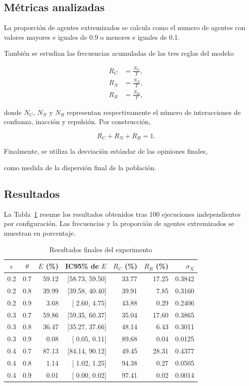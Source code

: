 \documentclass[11pt,a4paper]{article}
\begin{document}
\subsection{Métricas analizadas}

La proporción de agentes extremizados se calcula como el numero de agentes con valores mayores e iguales de 0.9 o menores e iguales de 0.1.

También se estudian las frecuencias acumuladas de las tres reglas del modelo:

\begin{align}
R_C &= \frac{N_C}{T},\\
R_N &= \frac{N_N}{T},\\
R_R &= \frac{N_R}{T},
\end{align}

donde $N_C$, $N_N$ y $N_R$ representan respectivamente el número de interacciones de confianza, inacción y repulsión. Por construcción,

\begin{equation}
R_C + R_N + R_R = 1.
\end{equation}

Finalmente, se utiliza la desviación estándar de las opiniones finales,

como medida de la dispersión final de la población.

\subsection{Resultados}

La Tabla~\ref{tab:baseline-results} resume los resultados obtenidos tras 100 ejecuciones independientes por configuración. Las frecuencias y la proporción de agentes extremizados se muestran en porcentaje.

\begin{table}[htbp]
\centering
\caption{Resultados finales del experimento}
\label{tab:baseline-results}
\small
\begin{tabular}{ccrrrrr}
\toprule
$\epsilon$ & $\theta$ &
$E$ (\%) &
IC95\% de $E$ &
$R_C$ (\%) &
$R_R$ (\%) &
$\sigma_X$ \\
\midrule
0.2 & 0.7 & 59.12 & [58.73, 59.50] & 33.77 & 17.25 & 0.3842 \\
0.2 & 0.8 & 39.99 & [39.58, 40.40] & 39.91 &  7.85 & 0.3160 \\
0.2 & 0.9 &  3.68 & [ 2.60,  4.75] & 43.88 &  0.29 & 0.2406 \\
0.3 & 0.7 & 59.86 & [59.35, 60.37] & 35.04 & 17.60 & 0.3865 \\
0.3 & 0.8 & 36.47 & [35.27, 37.66] & 48.14 &  6.43 & 0.3011 \\
0.3 & 0.9 &  0.08 & [ 0.05,  0.11] & 89.68 &  0.04 & 0.0125 \\
0.4 & 0.7 & 87.13 & [84.14, 90.12] & 49.45 & 28.31 & 0.4377 \\
0.4 & 0.8 &  1.14 & [ 1.02,  1.25] & 94.38 &  0.27 & 0.0505 \\
0.4 & 0.9 &  0.01 & [ 0.00,  0.02] & 97.41 &  0.02 & 0.0014 \\
\bottomrule
\end{tabular}
\end{table}
\end{document}
